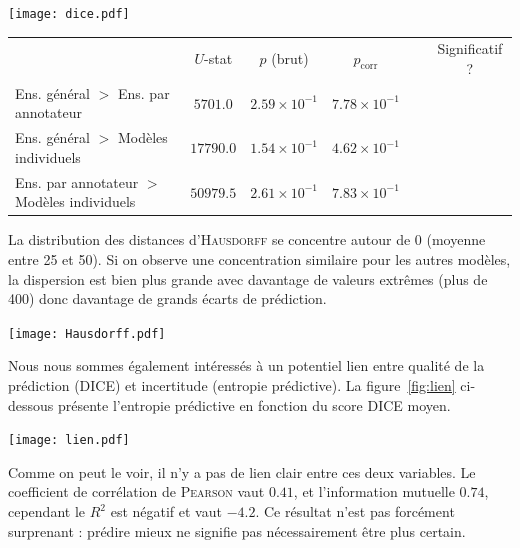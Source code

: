 \documentclass[a4paper,french,bookmarks,12pt]{article}
\begin{document}
    \begin{center}
        \centering
        \texttt{[image: dice.pdf]}
        \label{fig:dice}
    \end{center}
    \bigskip
    \begin{center}
        \footnotesize
        \begin{NiceTabular}{@{}l c c c c c@{}}
            \toprule
             & $U$-stat & $p$ (brut) & $p_{\text{corr}}$ & ~ & Significatif ? \\
             
            Ens. général $>$ Ens. par annotateur     & $5701.0$   & $2.59\times 10^{-1}$  & $7.78\times 10^{-1}$  & ~ &  \\
            Ens. général $>$ Modèles individuels     & $17790.0$  & $1.54\times 10^{-1}$  & $4.62\times 10^{-1}$  & ~ &  \\
            Ens. par annotateur $>$ Modèles individuels & $50979.5$ & $2.61\times 10^{-1}$  & $7.83\times 10^{-1}$  & ~ &  \\
            \bottomrule
        \end{NiceTabular}
        \label{tab:dice}
    \end{center}
    \medskip
    La distribution des distances d'\textsc{Hausdorff} se concentre autour de 0 (moyenne entre 25 et 50). Si on observe une concentration similaire pour les autres modèles, la dispersion est bien plus grande avec davantage de valeurs extrêmes (plus de 400) donc davantage de grands écarts de prédiction.

    \begin{center}
        \centering
        \texttt{[image: Hausdorff.pdf]}
        \label{fig:aurcece}
    \end{center}
    \medskip

    Nous nous sommes également intéressés à un potentiel lien entre qualité de la prédiction (DICE) et incertitude (entropie prédictive). La figure~\ref{fig:lien} ci-dessous présente l'entropie prédictive en fonction du score DICE moyen.

    \begin{center}
        \centering
        \texttt{[image: lien.pdf]}
        \label{fig:lien}
    \end{center}
    Comme on peut le voir, il n'y a pas de lien clair entre ces deux variables. Le coefficient de corrélation de \textsc{Pearson} vaut $0.41$, et l'information mutuelle $0.74$, cependant le $R^2$ est négatif et vaut $-4.2$. Ce résultat n'est pas forcément surprenant : prédire mieux ne signifie pas nécessairement être plus certain.
    
\end{document}
